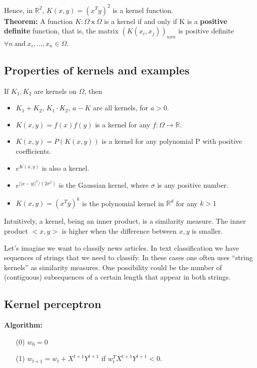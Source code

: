 \documentclass[11pt, english]{article}
\begin{document}
Hence, in $\mathbb{R}^2$, $K(x,y) = (x^Ty)^2$ is a kernel function.\\

\textbf{Theorem:} A function $K : \Omega\ \text{x}\ \Omega$ is a kernel if and only if K is a \textbf{positive definite} function, that is, the matrix $(K(x_i,x_j))_{n x n}$ is positive definite $\forall n\ \text{and}\ x_i, \dots, x_n \in \Omega$.

\subsection{Properties of kernels and examples}

If $K_1, K_2$ are kernels on $\Omega$, then 
\begin{itemize}
	\item $K_1 + K_2$, $K_1 \cdot K_2$, $a - K$ are all kernels, for $a>0$.
	\item $K(x,y) = f(x)f(y)$ is a kernel for any $f: \Omega \rightarrow \mathbb{R}$.
	\item $K(x,y) = P(K(x,y))$ is a kernel for any polynomial P with positive coefficients.
	\item $e^{K(x,y)}$ is also a kernel.
	\item $e^{||x-y||^2 /(2\sigma^2)}$ is the Gaussian kernel, where $\sigma$ is any positive number.
	\item $K(x,y) = (x^Ty)^k$ is the polynomial kernel in $\mathbb{R}^d$ for any $k>1$
\end{itemize}

Intuitively, a kernel, being an inner product, is a similarity measure. The inner product $<x,y>$ is higher when the difference between $x,y$ is smaller.

Let's imagine we want to classify news articles. In text classification we have sequences of strings that we need to classify. In these cases one often uses ``string kernels'' as similarity measures. One possibility could be the number of (contiguous) subsequences of a certain length that appear in both strings.

\subsection{Kernel perceptron}

\textbf{Algorithm:}
\begin{enumerate}
	\item[(0)] $w_0 = 0$
	\item[(1)] $w_{t+1} = w_t + X^{t+1}Y^{t+1}$ if $w^T_t X^{t+1}Y^{t+1}<0$. 
\end{enumerate}
\end{document}

